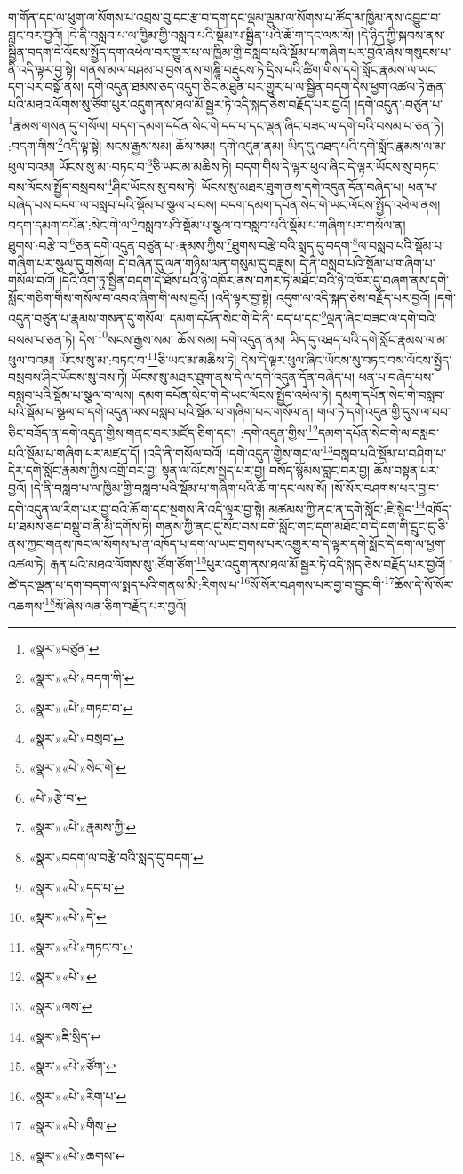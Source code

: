 ག་གོན་དང་ལ་ཕུག་ལ་སོགས་པ་འབྲས་བུ་དང་རྩ་བ་དག་དང་ལྡམ་ལྡུམ་ལ་སོགས་པ་ཚོད་མ་ཁྱིམ་ནས་འབྱུང་བ་བླང་བར་བྱའོ། །དེ་ནི་བསླབ་པ་ལ་ཁྱིམ་གྱི་བསླབ་པའི་སྡོམ་པ་སྦྱིན་པའི་ཆོ་ག་དང་ལས་སོ། །དེ་ཉིད་ཀྱི་སྐབས་ནས་སྦྱིན་བདག་དེ་ལོངས་སྤྱོད་དག་འཕེལ་བར་གྱུར་པ་ལ་ཁྱིམ་གྱི་བསླབ་པའི་སྡོམ་པ་གཞིག་པར་བྱའོ་ཞེས་གསུངས་པ་ནི་འདི་ལྟར་བྱ་སྟེ། གནས་མལ་བཤམ་པ་བྱས་ནས་གཎྜཱི་བརྡུངས་ཏེ་དྲིས་པའི་ཚིག་གིས་དགེ་སློང་རྣམས་ལ་ཡང་དག་པར་བསྒོ་ནས། དགེ་འདུན་ཐམས་ཅད་འདུག་ཅིང་མཐུན་པར་གྱུར་པ་ལ་སྦྱིན་བདག་དེས་ཕྱག་འཚལ་ཏེ་རྒན་པའི་མཐའ་ལོགས་སུ་ཙོག་པུར་འདུག་ནས་ཐལ་མོ་སྦྱར་ཏེ་འདི་སྐད་ཅེས་བརྗོད་པར་བྱའོ། །དགེ་འདུན་:བཙུན་པ་\footnote{«སྣར་»བཙུན་}རྣམས་གསན་དུ་གསོལ། བདག་དམག་དཔོན་སེང་གེ་དད་པ་དང་ལྡན་ཞིང་བཟང་ལ་དགེ་བའི་བསམ་པ་ཅན་ཏེ། :བདག་གིས་\footnote{«སྣར་»«པེ་»བདག་གི་}འདི་ལྟ་སྟེ། སངས་རྒྱས་སམ། ཆོས་སམ། དགེ་འདུན་ནམ། ཡིད་དུ་འཐད་པའི་དགེ་སློང་རྣམས་ལ་མ་ཕུལ་བའམ། ཡོངས་སུ་མ་:བཏང་བ་\footnote{«སྣར་»«པེ་»གཏང་བ་}ཅི་ཡང་མ་མཆིས་ཏེ། བདག་གིས་དེ་ལྟར་ཕུལ་ཞིང་དེ་ལྟར་ཡོངས་སུ་བཏང་བས་ལོངས་སྤྱོད་བསྲབས་\footnote{«སྣར་»«པེ་»བསྲབ་}ཤིང་ཡོངས་སུ་བས་ཏེ། ཡོངས་སུ་མཐར་ཐུག་ནས་དགེ་འདུན་དོན་བཞེད་པ། ཕན་པ་བཞེད་པས་བདག་ལ་བསླབ་པའི་སྡོམ་པ་སྩལ་པ་བས། བདག་དམག་དཔོན་སེང་གེ་ཡང་ལོངས་སྤྱོད་འཕེལ་ནས། བདག་དམག་དཔོན་:སེང་གེ་ལ་\footnote{«སྣར་»«པེ་»སེང་གེ་}བསླབ་པའི་སྡོམ་པ་སྩལ་བ་བསླབ་པའི་སྡོམ་པ་གཞིག་པར་གསོལ་ན། ཐུགས་:བརྩེ་བ་\footnote{«པེ་»རྩེ་བ་}ཅན་དགེ་འདུན་བཙུན་པ་:རྣམས་ཀྱིས་\footnote{«སྣར་»«པེ་»རྣམས་ཀྱི་}ཐུགས་བརྩེ་བའི་སླད་དུ་བདག་\footnote{«སྣར་»བདག་ལ་བརྩེ་བའི་སླད་དུ་བདག་}ལ་བསླབ་པའི་སྡོམ་པ་གཞིག་པར་སྩལ་དུ་གསོལ། དེ་བཞིན་དུ་ལན་གཉིས་ལན་གསུམ་དུ་བཟླས། དེ་ནི་བསླབ་པའི་སྡོམ་པ་གཞིག་པ་གསོལ་བའོ། །དེའི་འོག་ཏུ་སྦྱིན་བདག་དེ་ཐོས་པའི་ཉེ་འཁོར་ནས་བཀར་ཏེ་མཐོང་བའི་ཉེ་འཁོར་དུ་བཞག་ནས་དགེ་སློང་གཅིག་གིས་གསོལ་བ་འབའ་ཞིག་གི་ལས་བྱའོ། །འདི་ལྟར་བྱ་སྟེ། འདུག་ལ་འདི་སྐད་ཅེས་བརྗོད་པར་བྱའོ། །དགེ་འདུན་བཙུན་པ་རྣམས་གསན་དུ་གསོལ། དམག་དཔོན་སེང་གེ་དེ་ནི་:དད་པ་དང་\footnote{«སྣར་»«པེ་»དད་པ་}ལྡན་ཞིང་བཟང་ལ་དགེ་བའི་བསམ་པ་ཅན་ཏེ། དེས་\footnote{«སྣར་»«པེ་»དེ་}སངས་རྒྱས་སམ། ཆོས་སམ། དགེ་འདུན་ནམ། ཡིད་དུ་འཐད་པའི་དགེ་སློང་རྣམས་ལ་མ་ཕུལ་བའམ། ཡོངས་སུ་མ་:བཏང་བ་\footnote{«སྣར་»«པེ་»གཏང་བ་}ཅི་ཡང་མ་མཆིས་ཏེ། དེས་དེ་ལྟར་ཕུལ་ཞིང་ཡོངས་སུ་བཏང་བས་ལོངས་སྤྱོད་བསྲབས་ཤིང་ཡོངས་སུ་བས་ཏེ། ཡོངས་སུ་མཐར་ཐུག་ནས་དེ་ལ་དགེ་འདུན་དོན་བཞེད་པ། ཕན་པ་བཞེད་པས་བསླབ་པའི་སྡོམ་པ་སྩལ་བ་ལས། དམག་དཔོན་སེང་གེ་དེ་ཡང་ལོངས་སྤྱོད་འཕེལ་ཏེ། དམག་དཔོན་སེང་གེ་བསླབ་པའི་སྡོམ་པ་སྩལ་བ་དགེ་འདུན་ལས་བསླབ་པའི་སྡོམ་པ་གཞིག་པར་གསོལ་ན། གལ་ཏེ་དགེ་འདུན་གྱི་དུས་ལ་བབ་ཅིང་བཟོད་ན་དགེ་འདུན་གྱིས་གནང་བར་མཛོད་ཅིག་དང་། :དགེ་འདུན་གྱིས་\footnote{«སྣར་»«པེ་»}དམག་དཔོན་སེང་གེ་ལ་བསླབ་པའི་སྡོམ་པ་གཞིག་པར་མཛད་དོ། །འདི་ནི་གསོལ་བའོ། །དགེ་འདུན་གྱིས་གང་ལ་\footnote{«སྣར་»ལས་}བསླབ་པའི་སྡོམ་པ་བཤིག་པ་དེར་དགེ་སློང་རྣམས་ཀྱིས་འགྲོ་བར་བྱ། སྟན་ལ་ལོངས་སྤྱད་པར་བྱ། བསོད་སྙོམས་བླང་བར་བྱ། ཆོས་བསྟན་པར་བྱའོ། །དེ་ནི་བསླབ་པ་ལ་ཁྱིམ་གྱི་བསླབ་པའི་སྡོམ་པ་གཞིག་པའི་ཆོ་ག་དང་ལས་སོ། །སོ་སོར་བཤགས་པར་བྱ་བ་དགེ་འདུན་ལ་རིག་པར་བྱ་བའི་ཆོ་ག་དང་སྔགས་ནི་འདི་ལྟར་བྱ་སྟེ། མཚམས་ཀྱི་ནང་ན་དགེ་སློང་:ཇི་སྙེད་\footnote{«སྣར་»ཇི་སྲིད་}འཁོད་པ་ཐམས་ཅད་བསྡུ་བ་ནི་མི་དགོས་ཏེ། གནས་ཀྱི་ནང་དུ་སོང་བས་དགེ་སློང་གང་དག་མཐོང་བ་དེ་དག་གི་དྲུང་དུ་ཅི་ནས་ཀྱང་གནས་ཁང་ལ་སོགས་པ་ན་འཁོད་པ་དག་ལ་ཡང་གྲགས་པར་འགྱུར་བ་དེ་ལྟར་དགེ་སློང་དེ་དག་ལ་ཕྱག་འཚལ་ཏེ། རྒན་པའི་མཐའ་ལོགས་སུ་:ཙོག་ཙོག་\footnote{«སྣར་»«པེ་»ཙོག་}པུར་འདུག་ནས་ཐལ་མོ་སྦྱར་ཏེ་འདི་སྐད་ཅེས་བརྗོད་པར་བྱའོ། །ཚེ་དང་ལྡན་པ་དག་བདག་ལ་སྨད་པའི་གནས་མི་:རིགས་པ་\footnote{«སྣར་»«པེ་»རིག་པ་}སོ་སོར་བཤགས་པར་བྱ་བ་བྱུང་གི་\footnote{«སྣར་»«པེ་»གིས་}ཆོས་དེ་སོ་སོར་འཆགས་\footnote{«སྣར་»«པེ་»ཆགས་}སོ་ཞེས་ལན་ཅིག་བརྗོད་པར་བྱའོ། 